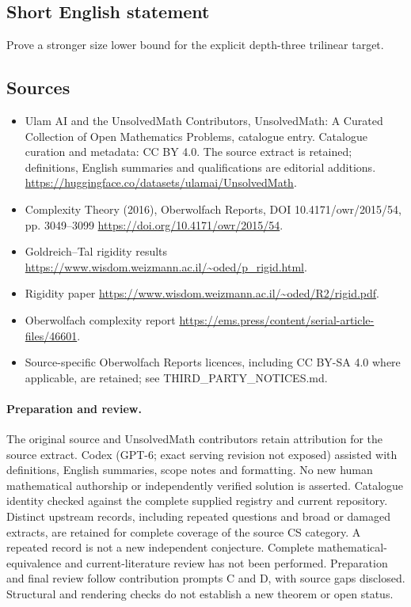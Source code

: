 \documentclass[11pt]{article}
\begin{document}
\subsection{Short English statement}
Prove a stronger size lower bound for the explicit depth-three trilinear target.
\subsection{Sources}
\begin{itemize}
\item[\hypertarget{source:statement:1}{S1}] Ulam AI and the UnsolvedMath Contributors, UnsolvedMath: A Curated Collection of Open Mathematics Problems, catalogue entry. Catalogue curation and metadata: CC BY 4.0. The source extract is retained; definitions, English summaries and qualifications are editorial additions.
\url{https://huggingface.co/datasets/ulamai/UnsolvedMath}.
\item[\hypertarget{source:statement:2}{S2}] Complexity Theory (2016), Oberwolfach Reports, DOI 10.4171/owr/2015/54, pp. 3049--3099
\url{https://doi.org/10.4171/owr/2015/54}.
\item[\hypertarget{source:statement:3}{S3}] Goldreich--Tal rigidity results
\url{https://www.wisdom.weizmann.ac.il/~oded/p_rigid.html}.
\item[\hypertarget{source:statement:4}{S4}] Rigidity paper
\url{https://www.wisdom.weizmann.ac.il/~oded/R2/rigid.pdf}.
\item[\hypertarget{source:statement:5}{S5}] Oberwolfach complexity report
\url{https://ems.press/content/serial-article-files/46601}.
\item Source-specific Oberwolfach Reports licences, including CC BY-SA 4.0 where applicable, are retained; see THIRD\_PARTY\_NOTICES.md.
\end{itemize}
\paragraph{Preparation and review.}
The original source and UnsolvedMath contributors retain attribution for the source extract. Codex (GPT-6; exact serving revision not exposed) assisted with definitions, English summaries, scope notes and formatting. No new human mathematical authorship or independently verified solution is asserted. Catalogue identity checked against the complete supplied registry and current repository. Distinct upstream records, including repeated questions and broad or damaged extracts, are retained for complete coverage of the source CS category. A repeated record is not a new independent conjecture. Complete mathematical-equivalence and current-literature review has not been performed. Preparation and final review follow contribution prompts C and D, with source gaps disclosed. Structural and rendering checks do not establish a new theorem or open status.
\label{end:statement}
\end{document}
